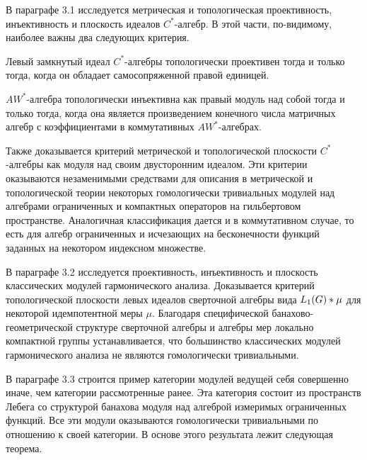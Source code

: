В параграфе 3.1 исследуется метрическая и топологическая проективность,
инъективность и плоскость идеалов $C^*$-алгебр. В этой части, по-видимому,
наиболее важны два следующих критерия.

\begin{theorem*}[3.1.4] Левый замкнутый идеал $C^*$-алгебры топологически
    проективен тогда и только тогда, когда он обладает самосопряженной правой
    единицей.
\end{theorem*}

\begin{theorem*}[3.1.11] $AW^*$-алгебра топологически инъективна как правый
    модуль над собой тогда и только тогда, когда она является произведением
    конечного числа матричных алгебр с коэффициентами в коммутативных
    $AW^*$-алгебрах.
\end{theorem*}

Также доказывается критерий метрической и топологической плоскости $C^*$-алгебры
как модуля над своим двусторонним идеалом. Эти критерии оказываются незаменимыми
средствами для описания в метрической и топологической теории некоторых
гомологически тривиальных модулей над алгебрами ограниченных и компактных
операторов на гильбертовом пространстве. Аналогичная классификация дается и в
коммутативном случае, то есть для алгебр ограниченных и исчезающих на
бесконечности функций заданных на некотором индексном множестве.

В параграфе 3.2 исследуется проективность, инъективность и плоскость
классических модулей гармонического анализа. Доказывается критерий
топологической плоскости левых идеалов сверточной алгебры вида
$L_1(G)\ast\mu$ для некоторой идемпотентной меры $\mu$. Благодаря
специфической банахово-геометрической структуре сверточной алгебры и алгебры мер
локально компактной группы устанавливается, что большинство классических модулей
гармонического анализа не являются гомологически тривиальными.

В параграфе 3.3 строится пример категории модулей ведущей себя совершенно иначе,
чем категории рассмотренные ранее. Эта категория состоит из пространств Лебега
со структурой банахова модуля над алгеброй измеримых ограниченных функций. Все
эти модули оказываются гомологически тривиальными по отношению к своей
категории. В основе этого результата лежит следующая теорема.

